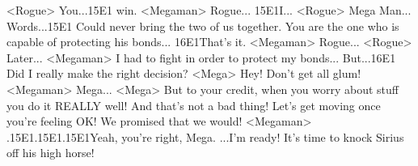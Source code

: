 <Rogue> You...{15}{E1} win. 
<Megaman> Rogue... {15}{E1}I... 
<Rogue> Mega Man... 
Words...{15}{E1} Could never bring the two of us together. 
You are the one who is capable of protecting his bonds... {16}{E1}That's it. 
<Megaman> Rogue... 
<Rogue> Later... 
<Megaman> I had to fight in order to protect my bonds... 
But...{16}{E1} Did I really make the right decision? 
<Mega> Hey! Don't get all glum! 
<Megaman> Mega... 
<Mega> But to your credit, when you worry about stuff you 
do it REALLY well! And that's not a bad thing! 
Let's get moving once you're feeling OK! 
We promised that we would! 
<Megaman> .{15}{E1}.{15}{E1}.{15}{E1}Yeah, you're right, Mega. 
...I'm ready! 
It's time to knock Sirius off his high horse! 
